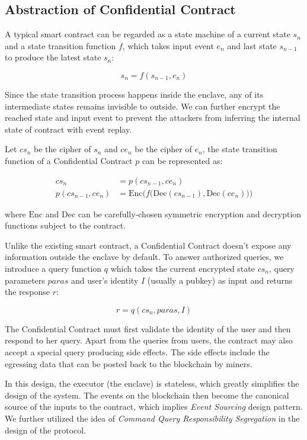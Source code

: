\subsection{Abstraction of Confidential Contract}

A typical smart contract can be regarded as a state machine of a current state $s_n$ and a state transition function $f$, which takes input event $e_n$ and last state $s_{n-1}$ to produce the latest state $s_n$:

$$
    s_n = f(s_{n-1}, e_n)
$$

Since the state transition process happens inside the enclave, any of its intermediate states remains invisible to outside.
We can further encrypt the reached state and input event to prevent the attackers from inferring the internal state of contract with event replay.

Let $cs_n$ be the cipher of $s_n$ and $ce_n$ be the cipher of $e_n$, the state transition function of a Confidential Contract $p$ can be represented as:

\begin{align}
    cs_n              & = p(cs_{n-1}, ce_n)                                                             \\
    p(cs_{n-1}, ce_n) & = \mathrm{Enc}\bigg(f\big(\mathrm{Dec}(cs_{n-1}), \mathrm{Dec}(ce_n)\big)\bigg)
\end{align}

where $\mathrm{Enc}$ and $\mathrm{Dec}$ can be carefully-chosen symmetric encryption and decryption functions subject to the contract.

Unlike the existing smart contract, a Confidential Contract doesn't expose any information outside the enclave by default. To answer authorized queries, we introduce a query function $q$ which takes the current encrypted state $cs_n$, query parameters $paras$ and user's identity $I$ (usually a pubkey) as input and returns the response $r$:

$$
    r = q(cs_n, paras, I)
$$

The Confidential Contract must first validate the identity of the user and then respond to her query. Apart from the queries from users, the contract may also accept a special query producing side effects. The side effects include the egressing data that can be posted back to the blockchain by miners.

In this design, the executor (the enclave) is stateless, which greatly simplifies the design of the system. The events on the blockchain then become the canonical source of the inputs to the contract, which implies \textit{Event Sourcing} design pattern. We further utilized the idea of \textit{Command Query Responsibility Segregation} in the design of the protocol.


